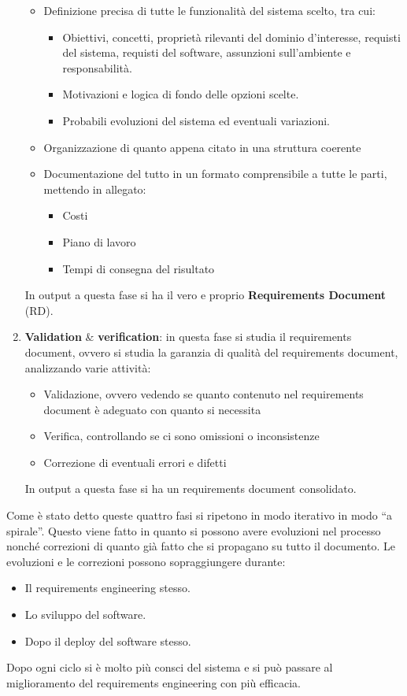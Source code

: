 \begin{enumerate}
    \begin{itemize}
        \item Definizione precisa di tutte le funzionalità del sistema scelto, tra cui:
        \begin{itemize}
            \item Obiettivi, concetti, proprietà rilevanti del dominio d'interesse, requisti del sistema, requisti del software, assunzioni sull'ambiente e responsabilità.
            \item Motivazioni e logica di fondo delle opzioni scelte.
            \item Probabili evoluzioni del sistema ed eventuali variazioni.
        \end{itemize}
        \item Organizzazione di quanto appena citato in una struttura coerente 
        \item Documentazione del tutto in un formato comprensibile a tutte le parti, mettendo in allegato:
        \begin{itemize}
            \item Costi
            \item Piano di lavoro
            \item Tempi di consegna del risultato
        \end{itemize}
    \end{itemize}
    In output a questa fase si ha il vero e proprio \textbf{Requirements Document} (RD).
    \item \textbf{Validation} $\&$ \textbf{verification}: in questa fase si studia il requirements document, ovvero si studia la garanzia di qualità del requirements document, analizzando varie attività:
    \begin{itemize}
        \item Validazione, ovvero vedendo se quanto contenuto nel requirements document è adeguato con quanto si necessita
        \item Verifica, controllando se ci sono omissioni o inconsistenze
        \item Correzione di eventuali errori e difetti
    \end{itemize}
    In output a questa fase si ha un requirements document consolidato.
\end{enumerate}

Come è stato detto queste quattro fasi si ripetono in modo iterativo in modo “a spirale”. Questo viene fatto in quanto si possono avere evoluzioni nel processo nonché correzioni di quanto già fatto che si propagano su tutto il documento. Le evoluzioni e le correzioni possono sopraggiungere durante:
\begin{itemize}
    \item Il requirements engineering stesso.
    \item Lo sviluppo del software.
    \item Dopo il deploy del software stesso.
\end{itemize}
Dopo ogni ciclo si è molto più consci del sistema e si può passare al miglioramento del requirements engineering con più efficacia.
